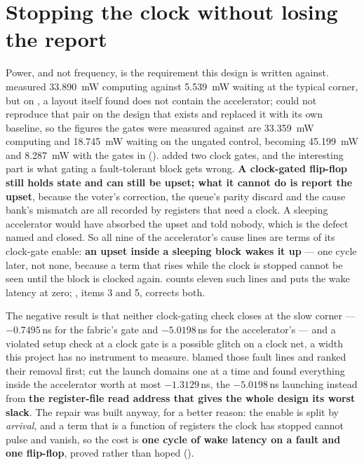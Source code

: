 \section{Stopping the clock without losing the report}
\label{sec:harden-clock}

Power, and not frequency, is the requirement this design is written
against.  measured \SI{33.890}{\milli\watt} computing against
\SI{5.539}{\milli\watt} waiting at the typical corner, but on
, a layout  itself found does not
contain the accelerator;  could not reproduce that
pair on the design that exists and replaced it with its own baseline,
so the figures the gates were measured against are
\SI{33.359}{\milli\watt} computing and \SI{18.745}{\milli\watt} waiting
on the ungated control, becoming \SI{45.199}{\milli\watt} and
\SI{8.287}{\milli\watt} with the gates in ().
 added two clock gates, and the interesting part is what gating a
fault-tolerant block gets wrong. \textbf{A
clock-gated flip-flop still holds state and can still be upset; what it
cannot do is report the upset}, because the voter's correction, the
queue's parity discard and the cause bank's mismatch are all recorded by
registers that need a clock. A sleeping accelerator would have absorbed
the upset and told nobody, which is the defect 
named and  closed. So all nine of the accelerator's cause lines
are terms of its clock-gate enable: \textbf{an upset inside a sleeping
block wakes it up} --- one cycle later, not none, because a term that
rises while the clock is stopped cannot be seen until the block is
clocked again.  counts eleven such lines and puts
the wake latency at zero; , items 3 and 5,
corrects both.

The negative result is that neither clock-gating check closes at the
slow corner --- $-0.7495$\,ns for the fabric's gate and
$-5.0198$\,ns for the accelerator's --- and a violated
setup check at a clock gate is a possible glitch on a clock net, a width
this project has no instrument to measure.  blamed those
fault lines and ranked their removal first;  cut the launch
domains one at a time and found everything inside the accelerator worth
at most $-1.3129$\,ns, the $-5.0198$\,ns
launching instead from \textbf{the register-file read address that gives
the whole design its worst slack}. The repair was built anyway, for a better
reason: the enable is split by \emph{arrival}, and a term that is a
function of registers the clock has stopped cannot pulse and vanish, so
the cost is \textbf{one cycle of wake latency on a fault and one
flip-flop}, proved rather than hoped ().

